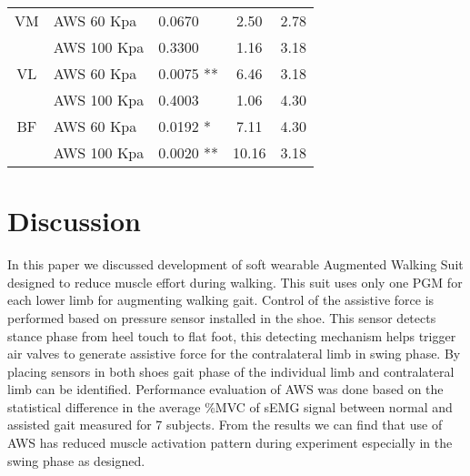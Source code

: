 \documentclass[letterpaper, 10 pt, conference]{ieeeconf}  %
\begin{document}
\begin{table}[]
\begin{tabular}{@{}cllcr@{}}
		VM               & AWS 60 Kpa                              & 0.0670                                        & 2.50                      & 2.78                                             \\
		& AWS 100 Kpa                             & 0.3300                                        & 1.16                      & 3.18                                             \\
		VL               & AWS 60 Kpa                              & 0.0075 **                                     & 6.46                      & 3.18                                             \\
		& AWS 100 Kpa                             & 0.4003                                        & 1.06                      & 4.30                                             \\
		BF               & AWS 60 Kpa                              & 0.0192 *                                      & 7.11                      & 4.30                                             \\
		& AWS 100 Kpa                             & 0.0020 **                                     & 10.16                     & 3.18                                             \\ \bottomrule
	\end{tabular}
\end{table}

\section{Discussion} \label{discuss}

In this paper we discussed development of soft wearable Augmented Walking Suit designed to reduce muscle effort during walking. This suit uses only one PGM for each lower limb for augmenting walking gait. Control of the assistive force is performed based on pressure sensor installed in the shoe. This sensor detects stance phase from heel touch to flat foot, this detecting mechanism helps trigger air valves to generate assistive force for the contralateral limb in swing phase. By placing sensors in both shoes gait phase of the individual limb and contralateral limb can be identified. Performance evaluation of AWS was done based on the statistical difference in the average \%MVC of sEMG signal between normal and assisted gait measured for 7 subjects. From the results we can find that use of AWS has reduced muscle activation pattern during experiment especially in the swing phase as designed. 
\end{document}
